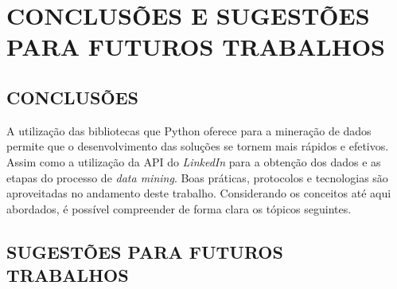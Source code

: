 \chapter{CONCLUSÕES E SUGESTÕES PARA FUTUROS TRABALHOS}\label{ch:conclusao}
\section{CONCLUSÕES} 
A utilização das bibliotecas que Python oferece para a mineração de dados permite que o desenvolvimento das soluções se tornem mais rápidos e efetivos. Assim como a utilização da API do \textit{LinkedIn} para a obtenção dos dados e as etapas do processo de \textit{data mining}. Boas práticas, protocolos e tecnologias são aproveitadas no andamento deste trabalho. Considerando os conceitos até aqui abordados, é possível compreender de forma clara os tópicos seguintes.

\section{SUGESTÕES PARA FUTUROS TRABALHOS}